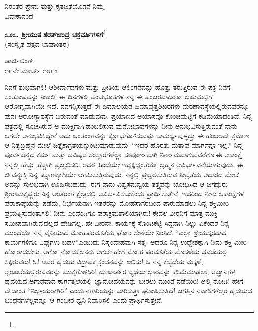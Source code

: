 \vspace{-0.5cm}

{\flushright
ನಿರಂತರ ಪ್ರೇಮ ಮತ್ತು ಕೃತಜ್ಞತೆಯೊಡನೆ ನಿಮ್ಮ\\ವಿವೇಕಾನಂದ\par}

\begin{center}
\textbf{೩೨೩. ಶ‍್ರೀಯುತ ಶರತ್‌ಚಂದ್ರ ಚಕ್ರವರ್ತಿಗಳಿಗೆ}\footnote{}\\ (ಸಂಸ್ಕೃತ ಪತ್ರದ ಭಾಷಾಂತರ)
\end{center}

\vspace{-0.65cm}

\begin{flushright}
ಡಾರ್ಜಿಲಿಂಗ್\\೧೯ನೇ ಮಾರ್ಚ್ ೧೮೯೭
\end{flushright}

ನಿನಗೆ ಶುಭವಾಗಲಿ! ಆಶೀರ್ವಾದಗಳು ಮತ್ತು ಪ್ರೀತಿಯ ಆಲಿಂಗನವನ್ನು ಹೊತ್ತು ತರುತ್ತಿರುವ ಈ ಪತ್ರ ನಿನಗೆ ಸಂತೋಷವನ್ನು ನೀಡಲಿ! ಈ ದಿನಗಳಲ್ಲಿ \hbox{ಪಂಚಭೂತಗಳ} ನನ್ನ ಈ ಪಂಜರವಾದರೋ ಬಹುಮಟ್ಟಿಗೆ ಆರೋಗ್ಯವಾಗಿಯೇ ಇದೆ. \hbox{ನನಗನ್ನಿಸುತ್ತದೆ} ಈ ಹಿಮಾಲಯದ ಹಿಮಾವೃತ್ತಶಿಖರಗಳು ಮರಣಾವಸ್ಥೆಯಲ್ಲಿರುವವರನ್ನೂ ಪುನಃ ಆರೋಗ್ಯಾವಸ್ಥೆಗೆ ಬರುವಂತೆ ಮಾಡುವುವು. ಪ್ರಯಾಣದ ಆಯಾಸವೂ ಕೊಂಚಮಟ್ಟಿಗೆ ಕಡಿಮೆಯಾದಂತಿದೆ. ನಿನ್ನ ಪತ್ರದಲ್ಲಿ ಸೂಚಿಸಿರುವ ಆ ಮುಕ್ತಿಗಾಗಿ ಹಂಬಲಿಸುವ ಮನೋಭಾವಗಳನ್ನು ನೀನು ಅನುಭವಿಸುತ್ತಿರುವಂತೆ ನಾನು ಆಗಲೇ ಅನುಭವಿಸಿದ್ದೇನೆ\enginline{-} ಅದು ಅಂತರಂಗವನ್ನು ಕ್ಷೋಭೆಗೊಳಿಸುವಷ್ಟು ಸಾಮರ್ಥ್ಯವುಳ್ಳದ್ದು\enginline{-} ಈ ಹಂಬಲವೇ ಕ್ರಮೇಣ ಆ ನಿತ್ಯಬ್ರಹ್ಮನ ಮೇಲೆ ಚಿತ್ತೈಕಾಗ್ರತೆಯನ್ನುಂಟುಮಾಡುವುದು. “ಇದರ ಹೊರತು ಮತ್ತಾವ ಮಾರ್ಗವೂ ಇಲ್ಲ.” ನಿನ್ನ ಪೂರ್ವಜನ್ಮದ ಕರ್ಮ ಮತ್ತು ಭವಿಷ್ಯದ ಸಂಸ್ಕಾರಗಳೆಲ್ಲಾ ಸಂಪೂರ್ಣವಾಗಿ ನಿರ್ನಾಮವಾಗುವವರೆಗೂ ಈ ಆಕಾಂಕ್ಷೆ ನಿನ್ನಲ್ಲಿ ಹೆಚ್ಚು ಹೆಚ್ಚಾಗಿ ಪ್ರಜ್ವಲಿಸಲಿ. ಅದರ ಹಿಂದೆಯೇ ಇದ್ದಕ್ಕಿದ್ದಂತೆಯೇ ಬ್ರಹ್ಮನ ಆವಿರ್ಭಾವನೆಯಾಗುವುದು. ಈ ಜೀವನ್ಮುಕ್ತಿ ನಿನ್ನ ಕಲ್ಯಾಣಕ್ಕಾಗಿಯೇ ಆಗಮಿಸುತ್ತಿರುವುದು. ನಿನ್ನಲ್ಲಿ ಪ್ರಜ್ವಲಿಸುತ್ತಿರುವ ತೀವ್ರತೆಯ ಆಧಾರದ ಮೇಲೆ ಅದನ್ನು ಸುಲಭವಾಗಿ ಊಹಿಸಬಹುದು. ಈಗ ನಾನು ವಿಶ್ವಸಮನ್ವಯ ತತ್ತ್ವವನ್ನು ಬೋಧಿಸಿದ ಆ ಜಗದ್ಗುರು ಶ‍್ರೀರಾಮಕೃಷ್ಣರು ನಿನ್ನ ಅಂತರಂಗ ಕ್ಷೇತ್ರದಲ್ಲಿ ಆವಿರ್ಭವಿಸಬೇಕೆಂದು ಪ್ರಾರ್ಥಿಸುತ್ತೇನೆ. ಇದರಿಂದ ನೀನು ಆಕಾಂಕ್ಷೆಗಳ ಪರಾಕಾಷ್ಠೆಯನ್ನು ಪಡೆದು, ನಿರ್ಭಯನಾಗಿ ಇತರರನ್ನು ಮೋಹಸಾಗರದಿಂದ ಪಾರುಮಾಡಲು ನಿನ್ನ ಶಕ್ತಿಮೀರಿ ಪ್ರಯತ್ನಿಸುವಂತಾಗಲಿ! ನೀನು ಎಂದೆಂದಿಗೂ ಪರಾಕ್ರಮಶಾಲಿಯಾಗಿರು! ಕೇವಲ ವೀರನಿಗೆ ಮಾತ್ರ ಮುಕ್ತಿ ಸಮೀಪವಾಗಿರುವುದಲ್ಲದೆ ಹೇಡಿಗಲ್ಲ. ಹೇ ವೀರನೇ, ಕಾರ್ಯಕ್ಕೆ ಸೊಂಟಕಟ್ಟಿ ಸಿದ್ಧನಾಗಿ ನಿಲ್ಲು\enginline{-} ಏಕೆಂದರೆ ನಿನ್ನ ಮುಂದೆಯೇ ನಿನ್ನ ವೈರಿಯಾದ ಮೋಹಪರವಶತೆಯ ಘೋರ ಸೇನೆಯೇ ನಿಂತಿದೆ. “ಎಲ್ಲಾ ಶ್ರೇಯಸ್ಕರವಾದ ಕಾರ್ಯಗಳಿಗೂ ವಿಘ್ನಗಳು ಬಹಳ”ಎಂಬುದು ನಿಸ್ಸಂದೇಹವಾಗಿ ಸತ್ಯ. ಆದರೂ ನಿನ್ನ ಉದ್ದೇಶಕ್ಕಾಗಿ ನೀನು ಶಕ್ತಿ ಮೀರಿ ಹೋರಾಡಬೇಕು. ಅಗೋ ನೋಡು!ಜನರು ಆಗಲೇ ಹೇಗೆ ಮೋಹ ಪರವಶತೆಯ ಮೊಸಳೆಯ ದವಡೆಯಲ್ಲಿ ಸಿಕ್ಕಿರುವರು! ಓ! ಅವರ ಹೃದಯ ವಿದ್ರಾವಕ ಕ್ರಂದನವನ್ನು ಆಲಿಸು! ಓ ನನ್ನ ಕೆಚ್ಚೆದೆಯ ಮಕ್ಕಳೆ, ಶೃಂಖಲೆಯಲ್ಲಿರುವವರನ್ನು ಮುಕ್ತಗೊಳಿಸಿರಿ! ದುಃಖಾರ್ತರ ವ್ಯಥೆಯ ಭಾರವನ್ನು ಕಡಿಮೆಮಾಡಲು, ಅಜ್ಞಾನಿಗಳ ಹೃದಯದ ಅಗಾಧವಾದ ಕಾರ್ಗತ್ತಲೆಯಲ್ಲಿ ಜ್ಞಾನೋದಯವನ್ನು ಬೀರಲು ಮುಂದೆ ನಡೆಯಿರಿ! ಅಲ್ಲಿ ನೋಡಿ! ಹೇಗೆ ವೇದಾಂತ “ನಿರ್ಭಯರಾಗಿರಿ” ಎಂದು ನಗಾರಿಯನ್ನು ಬಾರಿಸುತ್ತಾ ಘೋಷಿಸುತ್ತಿದೆ! ಜಗತ್ತಿನ ನಿವಾಸಿಗಳೆಲ್ಲರ ಹೃದಯದ ಬಂಧನಗಳೆಲ್ಲವನ್ನೂ ಆ ಗಂಭೀರ ಧ್ವನಿ ನಿವಾರಿಸಲಿ ಎಂದು ಪ್ರಾರ್ಥಿಸುತ್ತೇನೆ.

